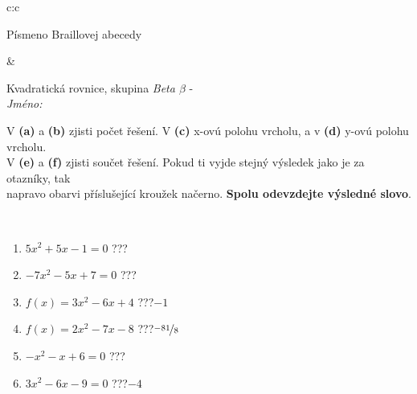 \documentclass[10pt]{report}
\begin{document}
\begin{tabular}{c:c}
\begin{minipage}[c][104.5mm][t]{0.5\linewidth}
\begin{center}
\begin{minipage}{0.20\linewidth}
\begin{center}
{\small Písmeno Braillovej abecedy}
\end{center}
\end{minipage}
\end{center}
\end{minipage}
&
\begin{minipage}[c][104.5mm][t]{0.5\linewidth}
\begin{center}
\vspace{7mm}
{\huge Kvadratická rovnice, skupina \textit{Beta $\beta$} -}\\[5mm]
\textit{Jméno:}\phantom{xxxxxxxxxxxxxxxxxxxxxxxxxxxxxxxxxxxxxxxxxxxxxxxxxxxxxxxxxxxxxxxxx}\\[5mm]
\begin{minipage}{0.95\linewidth}
\begin{center}
V \textbf{(a)} a \textbf{(b)} zjisti počet řešení. V \textbf{(c)} x-ovú polohu vrcholu, a v \textbf{(d)} y-ovú polohu vrcholu.\\V \textbf{(e)} a \textbf{(f)} zjisti součet řešení. Pokud ti vyjde stejný výsledek jako je za otazníky, tak\\napravo obarvi příslušející kroužek načerno. \textbf{Spolu odevzdejte výsledné slovo}.
\end{center}
\end{minipage}
\\[1mm]
\begin{minipage}{0.79\linewidth}
\begin{center}
\begin{varwidth}{\linewidth}
\begin{enumerate}
\Large
\item $5x^2+5x-1=0$\quad \dotfill\; ???\;\dotfill {}
\item $-7x^2-5x+7=0$\quad \dotfill\; ???\;\dotfill {}
\item $f(x)=3x^2-6x+4$\quad \dotfill\; ???\;\dotfill \quad $-1$
\item $f(x)=2x^2-7x-8$\quad \dotfill\; ???\;\dotfill \quad $\nicefrac{-81}{8}$
\item $-x^2-x+6=0$\quad \dotfill\; ???\;\dotfill {}
\item $3x^2-6x-9=0$\quad \dotfill\; ???\;\dotfill \quad $-4$
\end{enumerate}
\end{varwidth}
\end{center}
\end{minipage}
\begin{minipage}{0.20\linewidth}
\begin{center}

\end{center}
\end{minipage}
\end{center}
\end{minipage}
\end{tabular}
\end{document}
